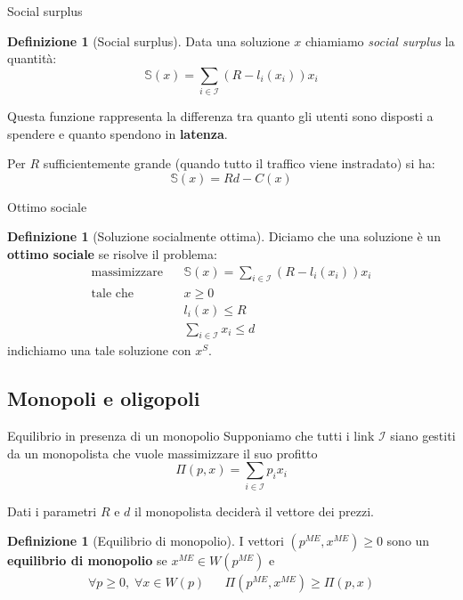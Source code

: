 \documentclass{beamer}
\newcounter{counter1}
\theoremstyle{plain}
\theoremstyle{definition}
\newtheorem{mydef}[counter1]{Definizione}
\theoremstyle{remark}
\newcommand{\pa}[1]{\left(#1\right)}
\begin{document}
\begin{frame}{Social surplus}
  \begin{mydef}[Social surplus]
    Data una soluzione $x$ chiamiamo \textit{social surplus} la
    quantità:
    \[ \mathbb{S}(x) = \sum _{i\in\mathcal{I}}\pa{ R -
        l_i\pa{x_i}}x_i \]
  \end{mydef}
  Questa funzione rappresenta la differenza tra quanto gli utenti sono
  disposti a spendere e quanto spendono in \textbf{latenza}.
  \vfill
  
  Per $R$ sufficientemente grande (quando tutto il traffico viene
  instradato) si ha:
  \[ \mathbb{S}(x) = Rd - C(x) \]
\end{frame}

\begin{frame}{Ottimo sociale}
  \begin{mydef}[Soluzione socialmente ottima]
    Diciamo che una soluzione è un \textbf{ottimo sociale} se risolve il
    problema:
    \begin{align*}
      \text{massimizzare }\;\; & \mathbb{S}(x) = \sum
                            _{i\in\mathcal{I}}\pa{ R - l_i\pa{x_i}}x_i
      \\
      \text{tale che }\;\; & x\ge 0\\
      & l_i(x) \le R \\
      & \sum _{i\in \mathcal{I}} x_i \le d
    \end{align*}
    indichiamo una tale soluzione con $x^S$.
  \end{mydef}
\end{frame}

\subsection{Monopoli e oligopoli}

\begin{frame}{Equilibrio in presenza di un monopolio}
  Supponiamo che tutti i link $\mathcal{I}$ siano gestiti da un
  monopolista che vuole massimizzare il suo profitto
  \[ \Pi (p,x) = \sum _{i\in\mathcal{I}} p_i x_i \]

  Dati i parametri $R$ e $d$ il monopolista deciderà il vettore dei
  prezzi.
  \begin{mydef}[Equilibrio di monopolio]
    I vettori $\pa{p^{ME},x^{ME}}\ge 0$ sono un \textbf{equilibrio di
      monopolio} se $x^{ME}\in W(p^{ME})$ e 
    \begin{align*}
      \forall p\ge 0,\; \forall x\in W(p) && \Pi \pa{p^{ME},x^{ME}}
                                             \ge \Pi \pa{p,x}
    \end{align*}
  \end{mydef}
\end{frame}
\end{document}
